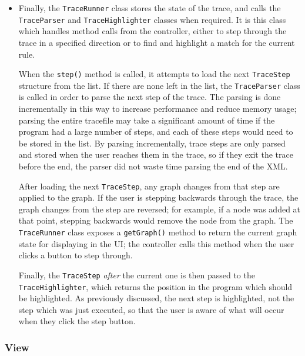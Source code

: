 \documentclass[authoryearcitations]{UoYCSproject}
\begin{document}
\begin{itemize}
    \item Finally, the \texttt{TraceRunner} class stores the state of the trace, and
          calls the \texttt{TraceParser} and \texttt{TraceHighlighter} classes when
          required. It is this class which handles method calls from the controller,
          either to step through the trace in a specified direction or to find and
          highlight a match for the current rule.

          When the \texttt{step()} method is called, it attempts to load the next
          \texttt{TraceStep} structure from the list. If there are none left in the
          list, the \texttt{TraceParser} class is called in order to parse the next
          step of the trace. The parsing is done incrementally in this way to increase
          performance and reduce memory usage; parsing the entire tracefile may take
          a significant amount of time if the program had a large number of steps, and
          each of these steps would need to be stored in the list. By parsing
          incrementally, trace steps are only parsed and stored when the user reaches
          them in the trace, so if they exit the trace before the end, the parser did
          not waste time parsing the end of the XML.

          After loading the next \texttt{TraceStep}, any graph changes from that step
          are applied to the graph. If the user is stepping backwards through the trace,
          the graph changes from the step are reversed; for example, if a node was
          added at that point, stepping backwards would remove the node from the graph.
          The \texttt{TraceRunner} class exposes a \texttt{getGraph()} method to return
          the current graph state for displaying in the UI; the controller calls this
          method when the user clicks a button to step through.

          Finally, the \texttt{TraceStep} \emph{after} the current one is then passed
          to the \texttt{TraceHighlighter}, which returns the position in the program
          which should be highlighted. As previously discussed, the next step is
          highlighted, not the step which was just executed, so that the user is aware
          of what will occur when they click the step button.

\end{itemize}

\subsubsection{View}
\label{sec:MVCView}
\end{document}
